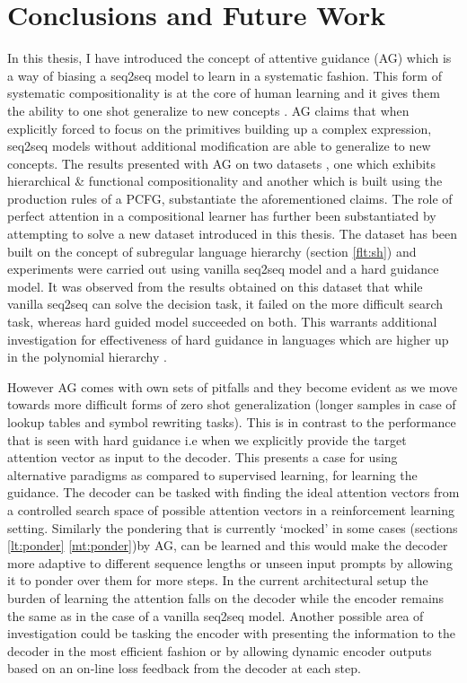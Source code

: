 \chapter{Conclusions and Future Work} \label{Chapter:conclusion}%
In this thesis, I have introduced the concept of attentive guidance (AG) which is a way of biasing a seq2seq model to learn in a systematic fashion. This form of systematic compositionality is at the core of human learning \citep{marcus2003algebraic} and it gives them the ability to one shot generalize to new concepts \citep{Lake2016}. AG claims that when explicitly forced to focus on the primitives building up a complex expression, seq2seq models without additional modification are able to generalize to new concepts. The results presented with AG on two datasets , one which exhibits hierarchical \& functional compositionality and another which is built using the production rules of a PCFG, substantiate the aforementioned claims. The role of perfect attention in a compositional learner has further been substantiated by attempting to solve a new dataset introduced in this thesis. The dataset has been built on the concept of subregular language hierarchy (section \ref{flt:sh}) and experiments were carried out using vanilla seq2seq model and a hard guidance model. It was observed from the results obtained on this dataset that while vanilla seq2seq can solve the decision task, it failed on the more difficult search task, whereas hard guided model succeeded on both. This warrants additional investigation for effectiveness of hard guidance in languages which are higher up in the polynomial hierarchy \citep{arora2009computational}. 

However AG comes with own sets of pitfalls and they become evident as we move towards more difficult forms of zero shot generalization (longer samples in case of lookup tables and symbol rewriting tasks). This is in contrast to the performance that is seen with hard guidance i.e when we explicitly provide the target attention vector as input to the decoder. This presents a case for using alternative paradigms as compared to supervised learning, for learning the guidance. The decoder can be tasked with finding the ideal attention vectors from a controlled search space of possible attention vectors in a reinforcement learning \citep{sutton2018reinforcement} setting. Similarly the pondering that is currently \lq mocked\rq{} in some cases (sections \ref{lt:ponder} \ref{mt:ponder})by AG, can be learned and this would make the decoder more adaptive to different sequence lengths or unseen input prompts by allowing it to ponder over them for more steps. In the current architectural setup the burden of learning the attention falls on the decoder while the encoder remains the same as in the case of a vanilla seq2seq model. Another possible area of investigation could be tasking the encoder with presenting the information to the decoder in the most efficient fashion or by allowing dynamic encoder outputs based on an on-line loss feedback from the decoder at each step. 

